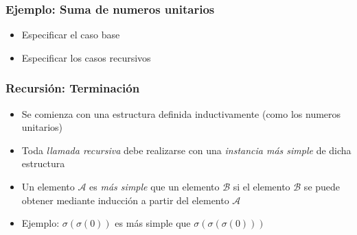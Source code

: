 \documentclass{beamer}
\begin{document}
\begin{frame}
    \frametitle{Ejemplo: Suma de numeros unitarios}
    \begin{itemize}
        \item{Especificar el caso base}
        \item{Especificar los casos recursivos}
    \end{itemize}
\end{frame}

\begin{frame}
    \frametitle{Recursi\'on: Terminaci\'on}
    \begin{itemize}
        \item{Se comienza con una estructura definida inductivamente (como los numeros unitarios)}
        \item{Toda \emph{llamada recursiva} debe realizarse con una \emph{instancia m\'as simple} de dicha estructura}
        \item{Un elemento $\mathcal{A}$ es \emph{m\'as simple} que un elemento $\mathcal{B}$ si
        el elemento $\mathcal{B}$ se puede obtener mediante inducci\'on a partir del elemento $\mathcal{A}$}
        \item{Ejemplo: $\sigma(\sigma(0))$ es m\'as simple que $\sigma(\sigma(\sigma(0)))$}
    \end{itemize}
\end{frame}
\end{document}
